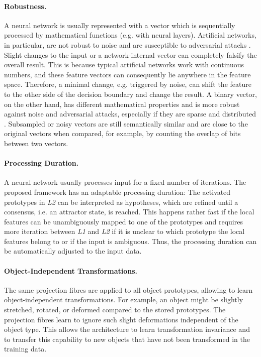 \paragraph{Robustness.} A neural network is usually represented with a vector which is sequentially processed by mathematical functions (e.g. with neural layers). Artificial networks, in particular, are not robust to noise and are susceptible to adversarial attacks . Slight changes to the input or a network-internal vector can completely falsify the overall result. This is because typical artificial networks work with continuous numbers, and these feature vectors can consequently lie anywhere in the feature space. Therefore, a minimal change, e.g. triggered by noise, can shift the feature to the other side of the decision boundary and change the result. A binary vector, on the other hand, has different mathematical properties and is more robust against noise and adversarial attacks, especially if they are sparse and distributed .
Subsampled or noisy vectors are still semantically similar and are close to the original vectors when compared, for example, by counting the overlap of bits between two vectors.

\paragraph{Processing Duration.} A neural network usually processes input for a fixed number of iterations. The proposed framework has an adaptable processing duration: The activated prototypes in \emph{L2} can be interpreted as hypotheses, which are refined until a consensus, i.e. an attractor state, is reached. This happens rather fast if the local features can be unambiguously mapped to one of the prototypes and requires more iteration between \emph{L1} and \emph{L2} if it is unclear to which prototype the local features belong to or if the input is ambiguous. Thus, the processing duration can be automatically adjusted to the input data.

\paragraph{Object-Independent Transformations.} The same projection fibres are applied to all object prototypes, allowing to learn object-independent transformations. For example, an object might be slightly stretched, rotated, or deformed compared to the stored prototypes. The projection fibres learn to ignore such slight deformations independent of the object type. This allows the architecture to learn transformation invariance and to transfer this capability to new objects that have not been transformed in the training data.

